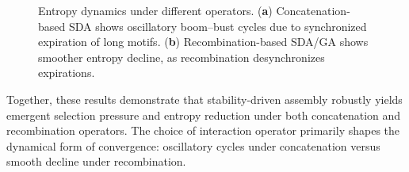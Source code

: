\documentclass[life,article,submit,pdftex,moreauthors]{Definitions/mdpi}
\begin{document}
\begin{figure}[H]
\centering
{}
\hfill
{}
\caption{Entropy dynamics under different operators. (\textbf{a}) Concatenation-based SDA shows oscillatory boom–bust cycles due to synchronized expiration of long motifs. (\textbf{b}) Recombination-based SDA/GA shows smoother entropy decline, as recombination desynchronizes expirations.}
\label{fig:entropy-comparison}
\end{figure}


Together, these results demonstrate that stability-driven assembly robustly yields emergent selection pressure and entropy reduction under both concatenation and recombination operators. The choice of interaction operator primarily shapes the dynamical form of convergence: oscillatory cycles under concatenation versus smooth decline under recombination.
\end{document}
